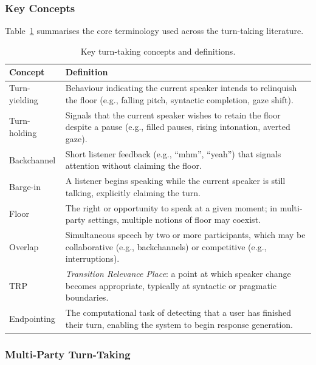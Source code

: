 \subsubsection{Key Concepts}

Table~\ref{tab:turntaking-concepts} summarises the core terminology used across the turn-taking literature.

\begin{table}[ht]
  \centering
  \caption{Key turn-taking concepts and definitions.}
  \label{tab:turntaking-concepts}
  \begin{tabularx}{\textwidth}{@{} l X @{}}
    \toprule
    \textbf{Concept} & \textbf{Definition} \\
    \midrule
    Turn-yielding   & Behaviour indicating the current speaker intends to relinquish the floor (e.g., falling pitch, syntactic completion, gaze shift). \\
    Turn-holding     & Signals that the current speaker wishes to retain the floor despite a pause (e.g., filled pauses, rising intonation, averted gaze). \\
    Backchannel      & Short listener feedback (e.g., ``mhm'', ``yeah'') that signals attention without claiming the floor. \\
    Barge-in         & A listener begins speaking while the current speaker is still talking, explicitly claiming the turn. \\
    Floor            & The right or opportunity to speak at a given moment; in multi-party settings, multiple notions of floor may coexist. \\
    Overlap          & Simultaneous speech by two or more participants, which may be collaborative (e.g., backchannels) or competitive (e.g., interruptions). \\
    TRP              & \emph{Transition Relevance Place}: a point at which speaker change becomes appropriate, typically at syntactic or pragmatic boundaries. \\
    Endpointing      & The computational task of detecting that a user has finished their turn, enabling the system to begin response generation. \\
    \bottomrule
  \end{tabularx}
\end{table}

\subsubsection{Multi-Party Turn-Taking}

